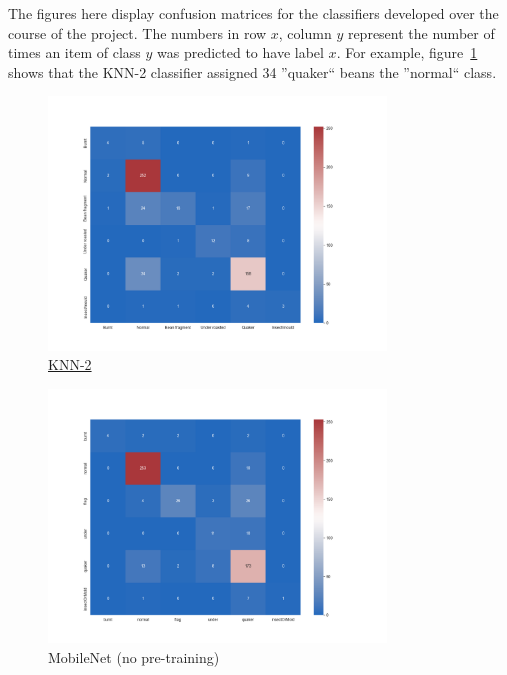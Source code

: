 The figures here display confusion matrices for the classifiers developed over the course of the project.
The numbers in row $x$, column $y$ represent the number of times an item of class $y$ was predicted to have label $x$.
For example, figure~\ref{fig:knn-2} shows that the KNN-2 classifier assigned 34 ''quaker`` beans the ''normal`` class.
\begin{figure}[!ht]
    \centering
    \includegraphics[width=0.8\textwidth]{figures/confusionMatrices/KNN-2}
    \caption[KNN-2]{\hyperref[tab:knnResults]{KNN-2}}
    \label{fig:knn-2}
\end{figure}

\begin{figure}[!ht]
    \centering
    \includegraphics[width=0.8\textwidth]{figures/confusionMatrices/mobileNet-no-pretraining0-5gamma}
    \caption{MobileNet (no pre-training)}
    \label{fig:mobileNetNoPt}
\end{figure}

